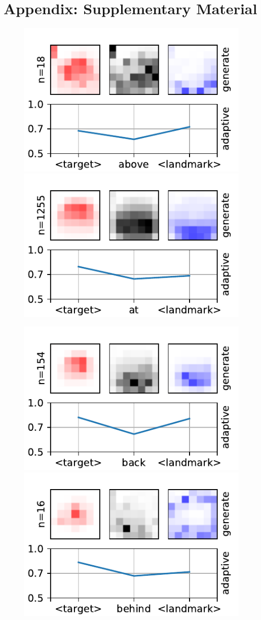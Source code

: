 \section{Appendix: Supplementary Material}

\begin{figure}[ht!]
	\centering
	\includegraphics[width=0.4\columnwidth]{studies/sivl2018/figures/above-adaptive.pdf}
	\includegraphics[width=0.4\columnwidth]{studies/sivl2018/figures/at-adaptive.pdf}
\end{figure}
\begin{figure}[ht!]
	\centering
	\includegraphics[width=0.4\columnwidth]{studies/sivl2018/figures/back-adaptive.pdf}
	\includegraphics[width=0.4\columnwidth]{studies/sivl2018/figures/behind-adaptive.pdf}
\end{figure}
